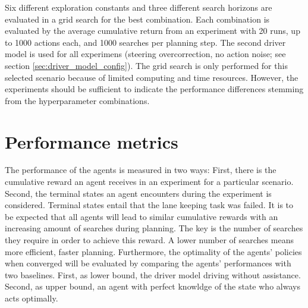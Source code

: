 Six different exploration constants and three different search horizons are evaluated in a grid search for the best combination. Each combination is evaluated by the average cumulative return from an experiment with 20 runs, up to 1000 actions each, and 1000 searches per planning step. The second driver model is used for all experimens (steering overcorrection, no action noise; see section \ref{sec:driver_model_config}). The grid search is only performed for this selected scenario because of limited computing and time resources. However, the experiments should be sufficient to indicate the performance differences stemming from the hyperparameter combinations.

\section{Performance metrics}
\label{sec:perf_metrics}


The performance of the agents is measured in two ways: First, there is the cumulative reward an agent receives in an experiment for a particular scenario. Second, the terminal states an agent encounters during the experiment is considered. Terminal states entail that the lane keeping task was failed. It is to be expected that all agents will lead to similar cumulative rewards with an increasing amount of searches during planning. The key is the number of searches they require in order to achieve this reward. A lower number of searches means more efficient, faster planning. Furthermore, the optimality of the agents' policies when converged will be evaluated by comparing the agents' performances with two baselines. First, as lower bound, the driver model driving without assistance. Second, as upper bound, an agent with perfect knowldge of the state who always acts optimally.

